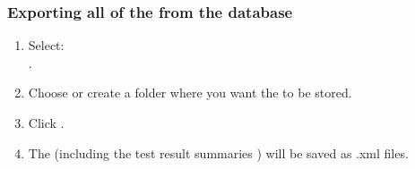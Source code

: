 \subsubsection{Exporting all of the \gdprojects{} from the database}
\label{exportall}
\begin{enumerate}
\item Select:\\
. 
\item Choose or create a folder where you want the \gdprojects{} to be stored. 
\item Click . 
\item The \gdprojects{} (including the test result summaries ) will be saved as .xml files. 

\end{enumerate}

